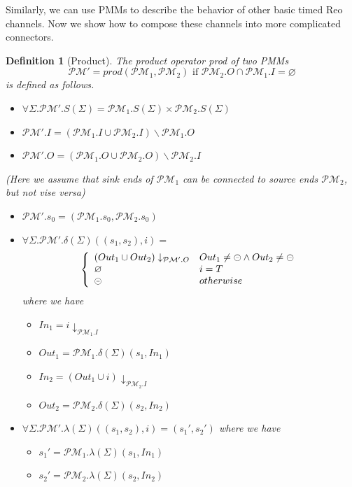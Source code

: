 \documentclass[conference, a4paper]{IEEEtran}
\newtheorem{definition}{Definition}
\newcommand{\rblock}[0]{\circleddash}
\newcommand{\rempty}[0]{\varnothing}
\begin{document}
Similarly, we can use PMMs to describe the behavior of other basic timed Reo
channels. Now we show how to compose these channels into more complicated connectors.

\begin{definition}[Product]
  The product operator \emph{prod} of two PMMs
  \[
  \mathcal{PM'} = prod(\mathcal{PM}_1,\mathcal{PM}_2)\mbox{ if }\mathcal{PM}_2.O\cap
  \mathcal{PM}_1.I=\varnothing
  \]
  is defined as follows.
  \begin{itemize}
  	\item[-] $\forall\Sigma. \mathcal{PM}'.S(\Sigma)=\mathcal{PM}_1.S(\Sigma)\times \mathcal{PM}_2.S(\Sigma)$
    \item[-] $\mathcal{PM}'.I=(\mathcal{PM}_1.I\cup \mathcal{PM}_2.I)\backslash \mathcal{PM}_1.O$
    \item[-] $\mathcal{PM}'.O=(\mathcal{PM}_1.O\cup \mathcal{PM}_2.O)\backslash \mathcal{PM}_2.I$
  \end{itemize}
  \emph{(Here we assume that sink ends of $\mathcal{PM}_1$ can be connected to source ends $\mathcal{PM}_2$, but not
  vise versa)}
  \begin{itemize}
    \item[-] $\mathcal{PM}'.s_0=(\mathcal{PM}_1.s_0, \mathcal{PM}_2.s_0)$
    \item[-] $\forall\Sigma. \mathcal{PM}'.\delta(\Sigma)((s_1,s_2), i)=$
      \begin{displaymath}
        \left\{
        \begin{array}[ht]{ll}
          (Out_1 \cup Out_2)\downarrow_{\mathcal{PM}'.O} & Out_1\neq\rblock\land Out_2\neq\rblock \\
          \rempty & i = T \\
          \rblock & otherwise \\
        \end{array}
        \right.
      \end{displaymath}
      where we have
      \begin{itemize}
        \item[*] $In_1 = i\downarrow_{\mathcal{PM}_1.I}$
        \item[*] $Out_1 = \mathcal{PM}_1.\delta(\Sigma)(s_1,In_1)$
        \item[*] $In_2 = (Out_1 \cup i)\downarrow_{\mathcal{PM}_2.I}$
        \item[*] $Out_2 = \mathcal{PM}_2.\delta(\Sigma)(s_2,In_2)$
      \end{itemize}
    \item[-] $\forall\Sigma. \mathcal{PM}'. \lambda(\Sigma)((s_1,s_2),i)=(s_1',s_2')$
      where we have
      \begin{itemize}
        \item[*] $s_1' = \mathcal{PM}_1.\lambda(\Sigma)(s_1,In_1)$
        \item[*] $s_2' = \mathcal{PM}_2.\lambda(\Sigma)(s_2,In_2)$
      \end{itemize}
  \end{itemize}
\end{definition}
\end{document}
